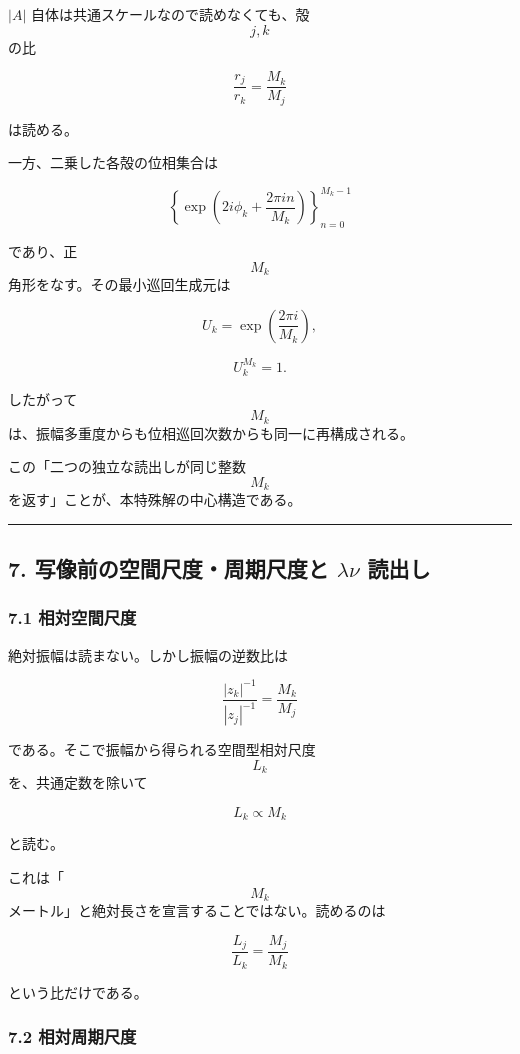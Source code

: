 \documentclass[
  a4paper,
]{ltjsarticle}
\begin{document}
\(|A|\) 自体は共通スケールなので読めなくても、殻 \[j,k\] の比

\[
\frac{r_j}{r_k}
=
\frac{M_k}{M_j}
\tag{22}
\]

は読める。

一方、二乗した各殻の位相集合は

\[
\left\{
\exp\left(2i\phi_k+\frac{2\pi i n}{M_k}\right)
\right\}_{n=0}^{M_k-1}
\]

であり、正 \[M_k\] 角形をなす。その最小巡回生成元は

\[
U_k
=
\exp\left(\frac{2\pi i}{M_k}\right),
\]

\[
U_k^{M_k}=1.
\tag{23}
\]

したがって \[M_k\]
は、振幅多重度からも位相巡回次数からも同一に再構成される。

この「二つの独立な読出しが同じ整数 \[M_k\]
を返す」ことが、本特殊解の中心構造である。

\begin{center}\rule{0.5\linewidth}{0.5pt}\end{center}

\subsection{\texorpdfstring{7. 写像前の空間尺度・周期尺度と
\(\lambda\nu\)
読出し}{7. 写像前の空間尺度・周期尺度と \textbackslash lambda\textbackslash nu 読出し}}\label{ux5199ux50cfux524dux306eux7a7aux9593ux5c3aux5ea6ux5468ux671fux5c3aux5ea6ux3068-lambdanu-ux8aadux51faux3057}

\subsubsection{7.1
相対空間尺度}\label{ux76f8ux5bfeux7a7aux9593ux5c3aux5ea6}

絶対振幅は読まない。しかし振幅の逆数比は

\[
\frac{|z_k|^{-1}}{|z_j|^{-1}}
=
\frac{M_k}{M_j}
\]

である。そこで振幅から得られる空間型相対尺度 \[L_k\]
を、共通定数を除いて

\[
\boxed{
L_k\propto M_k
}
\tag{24}
\]

と読む。

これは「\[M_k\] メートル」と絶対長さを宣言することではない。読めるのは

\[
\boxed{
\frac{L_j}{L_k}=\frac{M_j}{M_k}
}
\tag{25}
\]

という比だけである。

\subsubsection{7.2
相対周期尺度}\label{ux76f8ux5bfeux5468ux671fux5c3aux5ea6}
\end{document}
